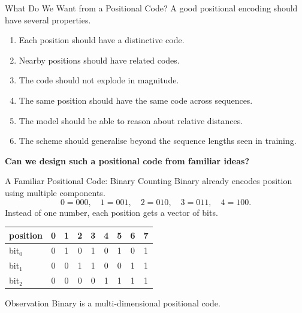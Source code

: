 \documentclass[aspectratio=169]{beamer}
\begin{document}
\begin{frame}{What Do We Want from a Positional Code?}
  A good positional encoding should have several properties.
  \begin{enumerate}
    \item Each position should have a distinctive code.
    \item Nearby positions should have related codes.
    \item The code should not explode in magnitude.
    \item The same position should have the same code across sequences.
    \item The model should be able to reason about relative distances.
    \item The scheme should generalise beyond the sequence lengths seen in training.
  \end{enumerate}

  \vspace{1em}
  \begin{center}
    \textbf{Can we design such a positional code from familiar ideas?}
  \end{center}
\end{frame}
%
%
\begin{frame}{A Familiar Positional Code: Binary Counting}
  Binary already encodes position using multiple components.
  \[
    0 = 000,\quad 1 = 001,\quad 2 = 010,\quad 3 = 011,\quad 4 = 100.
  \]
  Instead of one number, each position gets a vector of bits.

  \vspace{0.5em}
  \begin{center}
  {\small
  \begin{tabular}{lcccccccc}
    \toprule
    position & 0 & 1 & 2 & 3 & 4 & 5 & 6 & 7 \\
    \midrule
    bit$_0$  & 0 & 1 & 0 & 1 & 0 & 1 & 0 & 1 \\
    bit$_1$  & 0 & 0 & 1 & 1 & 0 & 0 & 1 & 1 \\
    bit$_2$  & 0 & 0 & 0 & 0 & 1 & 1 & 1 & 1 \\
    \bottomrule
  \end{tabular}}
  \end{center}

  \vspace{0.4em}
  \begin{block}{Observation}
    Binary is a multi-dimensional positional code.
  \end{block}
\end{frame}
\end{document}

